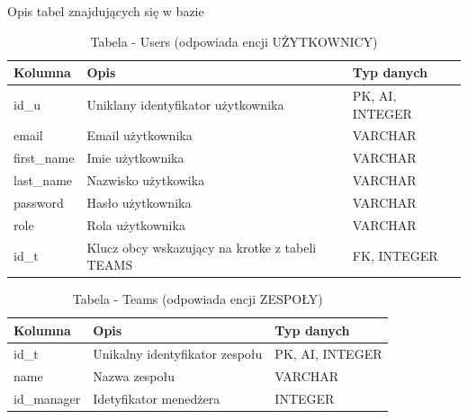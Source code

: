 Opis tabel znajdujących się w bazie

\begin{table}[h!]
    \centering
    \begin{tabular}{|p{3cm}|p{6cm}|p{4cm}|}
    \hline
    \textbf{Kolumna} & \textbf{Opis} & \textbf{Typ danych} \\ \hline
    id\_u & Uniklany identyfikator użytkownika & PK, AI, INTEGER\\ \hline
    email &   Email użytkownika & VARCHAR \\ \hline
    first\_name &   Imie użytkownika & VARCHAR \\ \hline
    last\_name &   Nazwisko użytkowika & VARCHAR \\ \hline
    password & Hasło użytkownika  & VARCHAR \\ \hline
    role & Rola użytkownika & VARCHAR \\ \hline
    id\_t & Klucz obcy wskazujący na krotke z tabeli TEAMS   & FK, INTEGER \\ \hline
    \end{tabular}
    \caption{Tabela - Users (odpowiada encji UŻYTKOWNICY)}
\end{table}

\begin{table}[h!]
    \centering
    \begin{tabular}{|p{3cm}|p{6cm}|p{4cm}|}
    \hline
    \textbf{Kolumna} & \textbf{Opis} &\textbf{Typ danych}  \\ \hline
    id\_t & Unikalny identyfikator zespołu &  PK, AI, INTEGER\\ \hline
    name & Nazwa zespołu & VARCHAR\\ \hline
    id\_manager & Idetyfikator menedżera & INTEGER \\ \hline
    \end{tabular}
    \caption{Tabela - Teams (odpowiada encji ZESPOŁY)}
\end{table}

